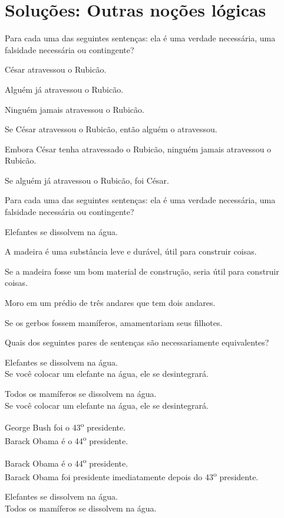 \chapter{Soluções: Outras noções lógicas}
\setcounter{ProbPart}{0}
\problempart
\label{pr.EnglishTautology}
Para cada uma das seguintes sentenças: ela é uma verdade necessária, uma falsidade necessária ou contingente?
\begin{compactlist}
\item César atravessou o Rubicão.
\hfill {}
\item Alguém já atravessou o Rubicão.
\hfill {}
\item Ninguém jamais atravessou o Rubicão.
\hfill {}
\item Se César atravessou o Rubicão, então alguém o atravessou.
\hfill {}
\item Embora César tenha atravessado o Rubicão, ninguém jamais atravessou o Rubicão.
\hfill {}
\item Se alguém já atravessou o Rubicão, foi César.
\hfill {}
\end{compactlist}

\problempart
Para cada uma das seguintes sentenças: ela é uma verdade necessária, uma falsidade necessária ou contingente?
\begin{compactlist}
\item Elefantes se dissolvem na água.
\item A madeira é uma substância leve e durável, útil para construir coisas.
\item Se a madeira fosse um bom material de construção, seria útil para construir coisas.
\item Moro em um prédio de três andares que tem dois andares.
\item Se os gerbos fossem mamíferos, amamentariam seus filhotes.
\end{compactlist}

\problempart Quais dos seguintes pares de sentenças são necessariamente equivalentes? 

\begin{compactlist}
\item Elefantes se dissolvem na água.	\\
	Se você colocar um elefante na água, ele se desintegrará.
\item Todos os mamíferos se dissolvem na água.\\		
	Se você colocar um elefante na água, ele se desintegrará.
\item George Bush foi o 43\textsuperscript{o} presidente. \\
	 Barack Obama é o 44\textsuperscript{o} presidente.
\item Barack Obama é o 44\textsuperscript{o} presidente. \\
	  Barack Obama foi presidente imediatamente depois do 43\textsuperscript{o} presidente.
\item Elefantes se dissolvem na água. 	\\	
	Todos os mamíferos se dissolvem na água.
\end{compactlist}

